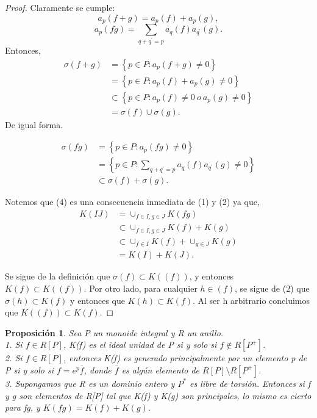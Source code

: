\documentclass[12pt,spanish]{amsart}
\newcommand{\set}[1]{\left\{{#1}\right\}}
\newtheorem{prop}[Theorem]{Proposición}
\theoremstyle{definition}
\theoremstyle{remark}
\begin{document}
\begin{proof}
Claramente se cumple:
$$a_{p}(f+g)=a_{p}(f)+a_{p}(g),$$
$$a_{p}(fg)=\sum_{q+q^{\prime}=p} a_{q}(f)a_{q^{\prime}}(g).$$
Entonces,
\begin{equation*}
\begin{split}
\sigma(f+g) &= \set{p\in P:a_{p}(f+g)\neq 0} \\
&= \set{p\in P:a_{p}(f)+a_{p}(g) \neq 0} \\
&\subset \set{p\in P:a_{p}(f)\neq 0~o~a_{p}(g)\neq 0} \\
&= \sigma(f)\cup \sigma(g).
\end{split}
\end{equation*}
De igual forma.

\begin{equation*}
\begin{split}
\sigma(fg) &= \set{p\in P:a_{p}(fg)\neq 0} \\
&= \set{p\in P:\sum_{q+q^{\prime}=p}a_{q}(f)a_{q^{\prime}}(g)\neq 0} \\
&\subset \sigma(f)+\sigma(g).
\end{split}
\end{equation*}

Notemos que (4) es una consecuencia inmediata de (1) y (2) ya que,
\begin{equation*}
\begin{split}
K(IJ) &= \cup_{f\in I,g\in J} K(fg) \\
&\subset \cup_{f\in I,g\in J} K(f)+K(g) \\
&\subset \cup_{f\in I} K(f) + \cup_{g\in J} K(g) \\
&= K(I)+K(J).
\end{split}
\end{equation*}

Se sigue de la definición que $\sigma(f) \subset K((f))$, y entonces $K(f) \subset K((f))$. Por otro lado, para cualquier $h\in (f)$, se sigue de (2) que $\sigma(h) \subset K(f)$ y entonces que $K(h) \subset K(f)$. Al ser h arbitrario concluimos que $K((f)) \subset K(f)$.  
\end{proof} 
 
 
\begin{prop}
Sea P un monoide \textit{integral} y R un anillo. \\
1. Si $f\in R[P]$, K(f) es el ideal unidad de P si y solo si $f\notin R[P^{+}]$. \\
2. Si $f\in R[P]$, entonces K(f) es generado principalmente por un elemento p de P si y solo si $f=e^{p}\overline{f}$, donde $\overline{f}$ es algún elemento de $R[P]\setminus R[P^{+}]$. \\ 
3. Supongamos que R es un dominio entero y $P^{\ast}$ es libre de torsión. Entonces si f y g son elementos de R[P] tal que K(f) y K(g) son principales, lo mismo es cierto para fg, y $K(fg)=K(f)+K(g)$. 
\end{prop}
\end{document}
